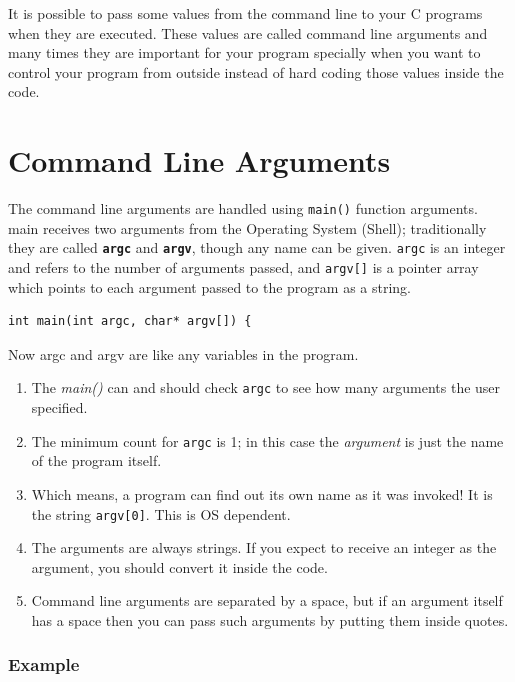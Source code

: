 \documentclass[11pt,a4paper]{article}
\author{TalentSprint}
\date{}
\begin{document}
It is possible to pass some values from the command line to your C programs when they are executed. These values are called command line arguments and many times they are important for your program specially when you want to control your program from outside instead of hard coding those values inside the code.

\section*{Command Line Arguments}
The command line arguments are handled using \texttt{main()} function arguments. main receives two arguments from the Operating System (Shell); traditionally they are called \textbf{\texttt{argc}} and \textbf{\texttt{argv}}, though any name can be given. \texttt{argc} is an integer and refers to the number of arguments passed, and \texttt{argv[]} is a pointer array which points to each argument passed to the program as a string.

\begin{lstlisting}[numbers=none]
  int main(int argc, char* argv[]) {
\end{lstlisting}

Now argc and argv are like any variables in the program.

\begin{enumerate}
\item The \emph{main()} can and should check \texttt{argc} to see how many arguments the user specified.
\item The minimum count for \texttt{argc} is 1; in this case the \emph{argument} is just the name of the program itself.
\item Which means, a program can find out its own name as it was invoked! It is the string \texttt{argv[0]}. This is OS dependent.
\item The arguments are always strings. If you expect to receive an integer as the argument, you should convert it inside the code. 
\item Command line arguments are separated by a space, but if an argument itself has a space then you can pass such arguments by putting them inside quotes.
\end{enumerate}

\subsubsection*{Example} 
\end{document}
